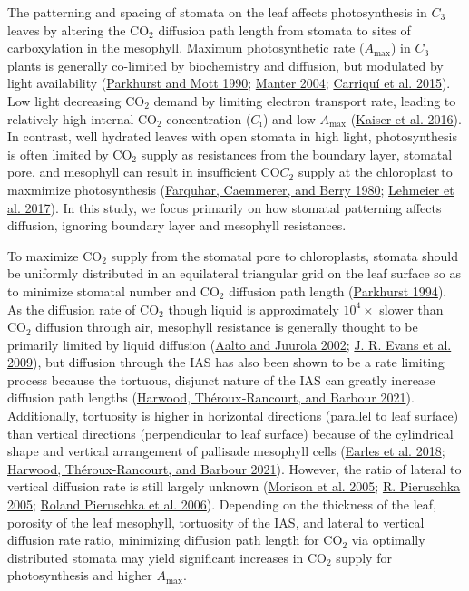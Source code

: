 \documentclass[12pt,halfline,a4paper,]{ouparticle}
\begin{document}
The patterning and spacing of stomata on the leaf affects photosynthesis
in \(C_3\) leaves by altering the CO\(_2\) diffusion path length from
stomata to sites of carboxylation in the mesophyll. Maximum
photosynthetic rate (\(A_\text{max}\)) in \(C_3\) plants is generally
co-limited by biochemistry and diffusion, but modulated by light
availability
(\protect\hyperlink{ref-parkhurst_intercellular_1990}{Parkhurst and Mott
1990}; \protect\hyperlink{ref-manter_ci_2004}{Manter 2004};
\protect\hyperlink{ref-carriqui_diffusional_2015}{Carriquí et al.
2015}). Low light decreasing CO\(_2\) demand by limiting electron
transport rate, leading to relatively high internal CO\(_2\)
concentration (\(C_\text{i}\)) and low \(A_\text{max}\)
(\protect\hyperlink{ref-kaiser_metabolic_2016}{Kaiser et al. 2016}). In
contrast, well hydrated leaves with open stomata in high light,
photosynthesis is often limited by CO\(_2\) supply as resistances from
the boundary layer, stomatal pore, and mesophyll can result in
insufficient CO\(C_2\) supply at the chloroplast to maxmimize
photosynthesis
(\protect\hyperlink{ref-farquhar_biochemical_1980}{Farquhar, Caemmerer,
and Berry 1980}; \protect\hyperlink{ref-lehmeier_cell_2017}{Lehmeier et
al. 2017}). In this study, we focus primarily on how stomatal patterning
affects diffusion, ignoring boundary layer and mesophyll resistances.

To maximize CO\(_2\) supply from the stomatal pore to chloroplasts,
stomata should be uniformly distributed in an equilateral triangular
grid on the leaf surface so as to minimize stomatal number and CO\(_2\)
diffusion path length
(\protect\hyperlink{ref-parkhurst_diffusion_1994}{Parkhurst 1994}). As
the diffusion rate of CO\(_2\) though liquid is approximately
\(10^4\times\) slower than CO\(_2\) diffusion through air, mesophyll
resistance is generally thought to be primarily limited by liquid
diffusion (\protect\hyperlink{ref-aalto_three-dimensional_2002}{Aalto
and Juurola 2002}; \protect\hyperlink{ref-evans_resistances_2009}{J. R.
Evans et al. 2009}), but diffusion through the IAS has also been shown
to be a rate limiting process because the tortuous, disjunct nature of
the IAS can greatly increase diffusion path lengths
(\protect\hyperlink{ref-harwood_understanding_2021}{Harwood,
Théroux‐Rancourt, and Barbour 2021}). Additionally, tortuosity is higher
in horizontal directions (parallel to leaf surface) than vertical
directions (perpendicular to leaf surface) because of the cylindrical
shape and vertical arrangement of pallisade mesophyll cells
(\protect\hyperlink{ref-earles_beyond_2018}{Earles et al. 2018};
\protect\hyperlink{ref-harwood_understanding_2021}{Harwood,
Théroux‐Rancourt, and Barbour 2021}). However, the ratio of lateral to
vertical diffusion rate is still largely unknown
(\protect\hyperlink{ref-morison_lateral_2005}{Morison et al. 2005};
\protect\hyperlink{ref-pieruschka_lateral_2005}{R. Pieruschka 2005};
\protect\hyperlink{ref-pieruschka_lateral_2006}{Roland Pieruschka et al.
2006}). Depending on the thickness of the leaf, porosity of the leaf
mesophyll, tortuosity of the IAS, and lateral to vertical diffusion rate
ratio, minimizing diffusion path length for CO\(_2\) via optimally
distributed stomata may yield significant increases in CO\(_2\) supply
for photosynthesis and higher \(A_\text{max}\).
\end{document}
